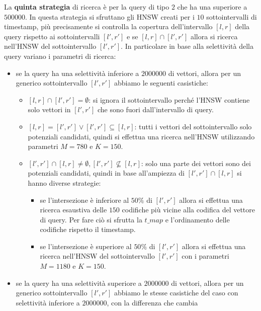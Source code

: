 La \textbf{quinta strategia} di ricerca è per la query di tipo $2$ che ha una 
superiore a $500000$. In questa strategia si sfruttano gli HNSW creati per i $10$
sottointervalli di timestamp, più precisamente si controlla la copertura dell'intervallo 
$[l,r]$ della query rispetto ai sottointervalli $[l',r']$ e se $[l,r]\cap [l',r']$ 
allora si ricerca nell'HNSW del sottointervallo $[l',r']$. 
In particolare in base alla selettività della query variano i parametri di ricerca:
\begin{itemize}
    \item se la query ha una selettività inferiore a $2000000$ di vettori, allora 
    per un generico sottointervallo $[l',r']$ abbiamo le seguenti casistiche:
    \begin{itemize}
        \item $[l,r]\cap [l',r'] = \emptyset$: si ignora il sottointervallo perché 
        l'HNSW contiene solo vettori in $[l',r']$ che sono fuori dall'intervallo 
        di query.
        \item $[l,r] = [l',r'] \lor  [l',r'] \subseteq [l,r]$: tutti i vettori 
        del sottointervallo solo potenziali candidati, quindi si effettua una ricerca nell'HNSW
        utilizzando parametri $M=780$ e $K=150$.
        \item $[l',r'] \cap [l,r] \ne \emptyset, [l',r'] \not \subseteq [l,r]$: 
        solo una parte dei vettori sono dei potenziali candidati, quindi in base 
        all'ampiezza di $[l',r'] \cap [l,r]$ si hanno diverse strategie:
        \begin{itemize}
            \item se l'intersezione è inferiore al $50\%$ di $[l',r']$ allora si effettua una 
            ricerca esaustiva delle $150$ codifiche più vicine alla codifica del 
            vettore di query. Per fare ciò si sfrutta la $t\_map$ e 
            l'ordinamento delle codifiche rispetto il timestamp.
            \item se l'intersezione è superiore al $50\%$ di $[l',r']$ allora si effettua una 
            ricerca nell'HNSW del sottointervallo $[l',r']$ con i parametri $M=1180$ e $K=150$.
        \end{itemize}
    \end{itemize}
    \item se la query ha una selettività superiore a $2000000$ di vettori, allora 
    per un generico sottointervallo $[l',r']$ abbiamo le stesse casistiche 
    del caso con selettività inferiore a $2000000$, con la differenza che cambia

\end{itemize}
